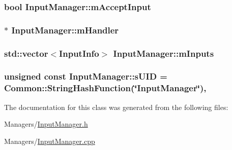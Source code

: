 \subsubsection[{\texorpdfstring{m\+Accept\+Input}{mAcceptInput}}]{\setlength{\rightskip}{0pt plus 5cm}bool Input\+Manager\+::m\+Accept\+Input\hspace{0.3cm}{\ttfamily [private]}}\hypertarget{classInputManager_acd38734c7f9faa6538868dff713a4bf6}{}\label{classInputManager_acd38734c7f9faa6538868dff713a4bf6}
\subsubsection[{\texorpdfstring{m\+Handler}{mHandler}}]{$\ast$ Input\+Manager\+::m\+Handler\hspace{0.3cm}{\ttfamily [private]}}\hypertarget{classInputManager_ab291f66f6227aa05357165ffedd2f634}{}\label{classInputManager_ab291f66f6227aa05357165ffedd2f634}
\subsubsection[{\texorpdfstring{m\+Inputs}{mInputs}}]{\setlength{\rightskip}{0pt plus 5cm}std\+::vector$<${\bf Input\+Info}$>$ Input\+Manager\+::m\+Inputs\hspace{0.3cm}{\ttfamily [private]}}\hypertarget{classInputManager_a639dfcc7c198f880217f667a48d99804}{}\label{classInputManager_a639dfcc7c198f880217f667a48d99804}
\subsubsection[{\texorpdfstring{s\+U\+ID}{sUID}}]{\setlength{\rightskip}{0pt plus 5cm}unsigned const Input\+Manager\+::s\+U\+ID = {\bf Common\+::\+String\+Hash\+Function}(\char`\"{}Input\+Manager\char`\"{})\hspace{0.3cm}{\ttfamily [static]}, {\ttfamily [private]}}\hypertarget{classInputManager_a0615dfbe325cf0af3708b9f8bdf22669}{}\label{classInputManager_a0615dfbe325cf0af3708b9f8bdf22669}


The documentation for this class was generated from the following files\+:\begin{DoxyCompactItemize}
\item 
Managers/\hyperlink{InputManager_8h}{Input\+Manager.\+h}\item 
Managers/\hyperlink{InputManager_8cpp}{Input\+Manager.\+cpp}\end{DoxyCompactItemize}
